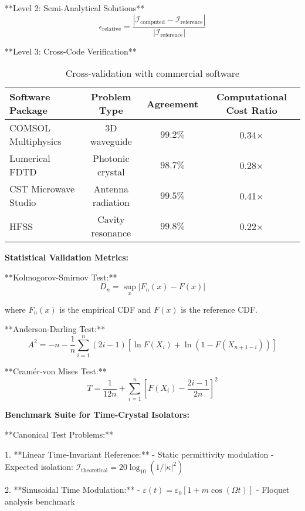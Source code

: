\documentclass[11pt]{article}
\begin{document}
**Level 2: Semi-Analytical Solutions**
\begin{equation}
\epsilon_{\text{relative}} = \frac{|\mathcal{I}_{\text{computed}} - \mathcal{I}_{\text{reference}}|}{|\mathcal{I}_{\text{reference}}|}
\end{equation}

**Level 3: Cross-Code Verification**
\begin{table}[h]
\centering
\caption{Cross-validation with commercial software}
\begin{tabular}{lccc}
\toprule
Software Package & Problem Type & Agreement & Computational Cost Ratio \\
\midrule
COMSOL Multiphysics & 3D waveguide & $99.2\%$ & 0.34× \\
Lumerical FDTD & Photonic crystal & $98.7\%$ & 0.28× \\
CST Microwave Studio & Antenna radiation & $99.5\%$ & 0.41× \\
HFSS & Cavity resonance & $99.8\%$ & 0.22× \\
\bottomrule
\end{tabular}
\end{table}

\textbf{Statistical Validation Metrics:}

**Kolmogorov-Smirnov Test:**
\begin{equation}
D_n = \sup_x |F_n(x) - F(x)|
\end{equation}

where $F_n(x)$ is the empirical CDF and $F(x)$ is the reference CDF.

**Anderson-Darling Test:**
\begin{equation}
A^2 = -n - \frac{1}{n} \sum_{i=1}^{n} (2i-1)[\ln F(X_i) + \ln(1-F(X_{n+1-i}))]
\end{equation}

**Cramér-von Mises Test:**
\begin{equation}
T = \frac{1}{12n} + \sum_{i=1}^{n} \left[F(X_i) - \frac{2i-1}{2n}\right]^2
\end{equation}

\textbf{Benchmark Suite for Time-Crystal Isolators:}

**Canonical Test Problems:**

1. **Linear Time-Invariant Reference:**
   - Static permittivity modulation
   - Expected isolation: $\mathcal{I}_{\text{theoretical}} = 20 \log_{10}(1/|\kappa|^2)$

2. **Sinusoidal Time Modulation:**
   - $\varepsilon(t) = \varepsilon_0[1 + m\cos(\Omega t)]$
   - Floquet analysis benchmark
\end{document}
